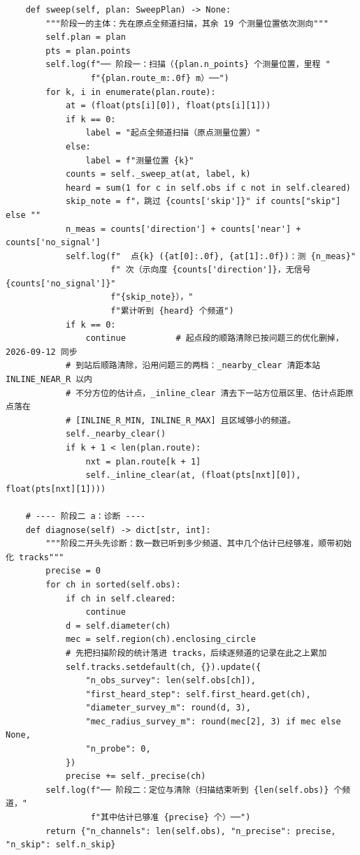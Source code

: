 \documentclass[UTF8, zihao=5,AutoFakeBold=2]{ctexart}
\begin{document}
\begin{lstlisting}
    def sweep(self, plan: SweepPlan) -> None:
        """阶段一的主体：先在原点全频道扫描，其余 19 个测量位置依次测向"""
        self.plan = plan
        pts = plan.points
        self.log(f"── 阶段一：扫描（{plan.n_points} 个测量位置，里程 "
                 f"{plan.route_m:.0f} m）──")
        for k, i in enumerate(plan.route):
            at = (float(pts[i][0]), float(pts[i][1]))
            if k == 0:
                label = "起点全频道扫描（原点测量位置）"
            else:
                label = f"测量位置 {k}"
            counts = self._sweep_at(at, label, k)
            heard = sum(1 for c in self.obs if c not in self.cleared)
            skip_note = f"，跳过 {counts['skip']}" if counts["skip"] else ""
            n_meas = counts['direction'] + counts['near'] + counts['no_signal']
            self.log(f"  点{k} ({at[0]:.0f}, {at[1]:.0f})：测 {n_meas}"
                     f" 次（示向度 {counts['direction']}，无信号 {counts['no_signal']}"
                     f"{skip_note}），"
                     f"累计听到 {heard} 个频道")
            if k == 0:
                continue          # 起点段的顺路清除已按问题三的优化删掉，2026-09-12 同步
            # 到站后顺路清除，沿用问题三的两档：_nearby_clear 清距本站 INLINE_NEAR_R 以内
            # 不分方位的估计点，_inline_clear 清去下一站方位扇区里、估计点距原点落在
            # [INLINE_R_MIN, INLINE_R_MAX] 且区域够小的频道。
            self._nearby_clear()
            if k + 1 < len(plan.route):
                nxt = plan.route[k + 1]
                self._inline_clear(at, (float(pts[nxt][0]), float(pts[nxt][1])))

    # ---- 阶段二 a：诊断 ----
    def diagnose(self) -> dict[str, int]:
        """阶段二开头先诊断：数一数已听到多少频道、其中几个估计已经够准，顺带初始化 tracks"""
        precise = 0
        for ch in sorted(self.obs):
            if ch in self.cleared:
                continue
            d = self.diameter(ch)
            mec = self.region(ch).enclosing_circle
            # 先把扫描阶段的统计落进 tracks，后续逐频道的记录在此之上累加
            self.tracks.setdefault(ch, {}).update({
                "n_obs_survey": len(self.obs[ch]),
                "first_heard_step": self.first_heard.get(ch),
                "diameter_survey_m": round(d, 3),
                "mec_radius_survey_m": round(mec[2], 3) if mec else None,
                "n_probe": 0,
            })
            precise += self._precise(ch)
        self.log(f"── 阶段二：定位与清除（扫描结束听到 {len(self.obs)} 个频道，"
                 f"其中估计已够准 {precise} 个）──")
        return {"n_channels": len(self.obs), "n_precise": precise, "n_skip": self.n_skip}


\end{lstlisting}
\end{document}
